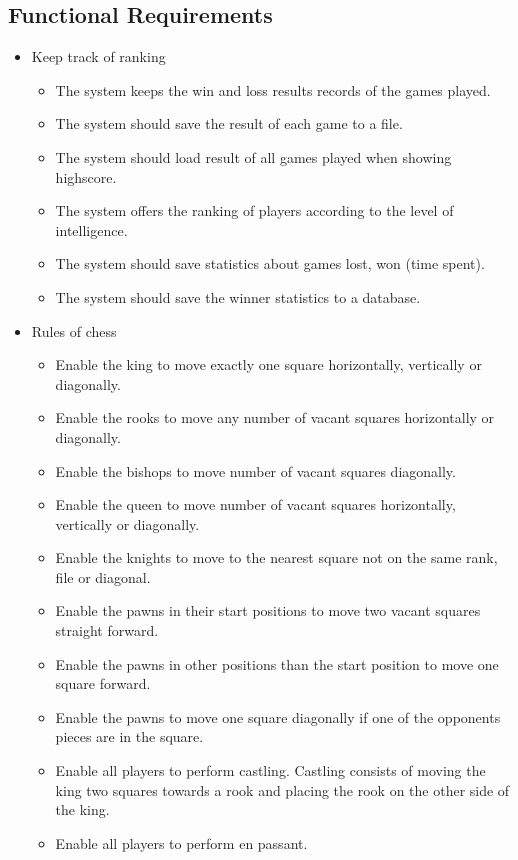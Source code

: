 \documentclass{article}
\begin{document}
\subsection{Functional Requirements}
\begin{itemize}
	\item Keep track of ranking
	\begin{itemize}
		\item The system keeps the win and loss results records of the games played.
		\item The system should save the result of each game to a file.
		\item The system should load result of all games played when showing highscore.
		\item The system offers the ranking of players according to the level of intelligence.
		\item The system should save statistics about games lost, won (time spent).
		\item The system should save the winner statistics to a database.
	\end{itemize}
	\item Rules of chess
	\begin{itemize}
		\item Enable the king to move exactly one square horizontally, vertically or diagonally.
		\item Enable the rooks to move any number of vacant squares horizontally or diagonally. 
		\item Enable the bishops to move number of vacant squares diagonally.
		\item Enable the queen to move number of vacant squares horizontally, vertically or diagonally.
		\item Enable the knights to move to the nearest square not on the same rank, file or diagonal. 
		\item Enable the pawns in their start positions to move two  vacant squares straight forward.
		\item Enable the pawns in other positions than the start position to move one square forward.
		\item Enable the pawns to move one square diagonally if one of the opponents pieces are in the square.
		\item Enable all players to perform castling. Castling consists of moving the king two squares towards a rook and placing the rook on the other side of the king. 
		\item Enable all players to perform en passant.

\end{itemize}
\end{itemize}
\end{document}
